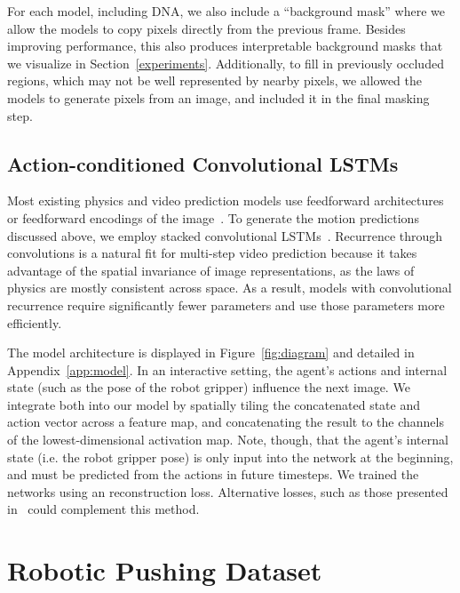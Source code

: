 \documentclass{article}
\newcommand{\atari}{acvpa-oglls-15}
\newcommand{\nyu}{vpbmse-mcl-16}
\begin{document}
For each model, including DNA, we also include a ``background mask'' where we allow the models to copy pixels directly from the previous frame.
Besides improving performance, this also produces interpretable background masks that we visualize in Section~\ref{experiments}.
Additionally, to fill in previously occluded regions, which may not be well represented by nearby pixels, we allowed the models
to generate pixels from an image, and included it in the final masking step.



\subsection{Action-conditioned Convolutional LSTMs}

Most existing physics and video prediction models use feedforward architectures~\cite{\nyu,lgf-lpibt-16} or feedforward encodings of the image~\cite{\atari}.
To generate the motion predictions discussed above, we employ stacked convolutional LSTMs~\cite{xcwyw-clstm-15}.
Recurrence through convolutions is a natural fit for multi-step video prediction because it takes advantage of the spatial invariance of image representations, as
the laws of physics are mostly consistent across space.
As a result, models with convolutional recurrence require significantly fewer parameters and use those parameters more efficiently.

The model architecture is displayed in Figure~\ref{fig:diagram}
and detailed in Appendix~\ref{app:model}. In an interactive setting, the agent's actions and internal state (such as the pose of the robot gripper) influence the next
image. We integrate both into our model by spatially tiling the concatenated state and action vector across a feature map, and concatenating the result
to the channels of the lowest-dimensional activation map.
Note, though, that the agent's internal state (i.e. the robot gripper pose) is only input into the network at the beginning,
and must be predicted from the actions in future timesteps. We trained the networks using an  reconstruction loss.
Alternative losses, such as those presented in~\cite{\nyu} could complement this method.



\section{Robotic Pushing Dataset}
\label{sec:dataset}
\end{document}
